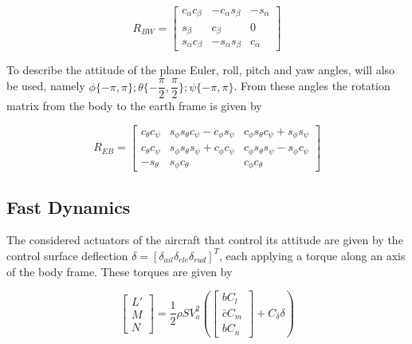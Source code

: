 \begin{equation}
R_{BW}=
\begin{bmatrix}
c_\alpha c_\beta & -c_\alpha s_\beta & -s_\alpha \\
s_\beta & c_\beta & 0 \\
s_\alpha c_\beta & -s_\alpha s_\beta & c_\alpha
\end{bmatrix}
\label{eq:wind2body}
\end{equation}

To describe the attitude of the plane Euler, roll, pitch and yaw angles, will also be used, namely $\phi\{-\pi,\pi\}; \theta \{-\dfrac{\pi}{2},\dfrac{\pi}{2}\}; \psi \{-\pi,\pi\}$. From these angles the rotation matrix from the body to the earth frame is given by

\begin{equation}
R_{EB}=
\begin{bmatrix}
c_\theta c_\psi & s_\phi s_\theta c_\psi - c_\phi s_\psi & c_\phi s_\theta c_\psi + s_\phi s_\psi \\
c_\theta c_\psi & s_\phi s_\theta s_\psi + c_\phi c_\psi & c_\phi s_\theta s_\psi - s_\phi c_\psi \\
-s_\theta & s_\phi c_\theta & c_\phi c_\theta
\end{bmatrix}
\label{eq:body2earth}
\end{equation}

\subsection{Fast Dynamics}
\label{section:background/model/fast_dynamics}

The considered actuators of the aircraft that control its attitude are given by the control surface deflection $\delta = [\delta_{ail} \delta_{ele} \delta_{rud}]^T$, each applying a torque along an axis of the body frame. These torques are given by

\begin{equation}
\begin{bmatrix}
L'\\
M\\
N
\end{bmatrix}
= \dfrac{1}{2}\rho S V_a^2\left(
\begin{bmatrix}
bC_l\\
\bar{c}C_m\\
bC_n
\end{bmatrix}
+ C_\delta \delta\right)
\label{eq:torque}
\end{equation}


